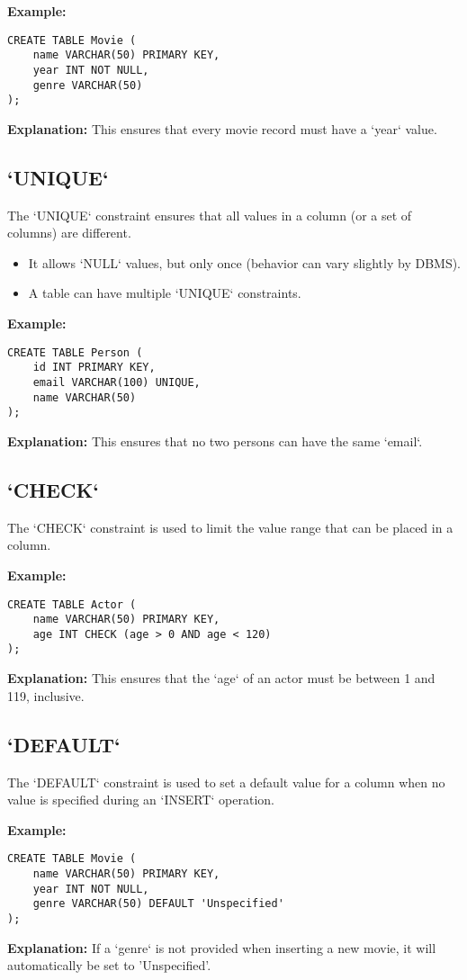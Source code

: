 \documentclass{article}
\begin{document}
\textbf{Example:} 
\begin{lstlisting}
CREATE TABLE Movie (
    name VARCHAR(50) PRIMARY KEY,
    year INT NOT NULL,
    genre VARCHAR(50)
);
\end{lstlisting}
\textbf{Explanation:} This ensures that every movie record must have a `year` value.

\subsection*{`UNIQUE`}
The `UNIQUE` constraint ensures that all values in a column (or a set of columns) are different.
\begin{itemize}
    \item It allows `NULL` values, but only once (behavior can vary slightly by DBMS). 
    \item A table can have multiple `UNIQUE` constraints. 
\end{itemize}

\textbf{Example:} 
\begin{lstlisting}
CREATE TABLE Person (
    id INT PRIMARY KEY,
    email VARCHAR(100) UNIQUE,
    name VARCHAR(50)
);
\end{lstlisting}
\textbf{Explanation:} This ensures that no two persons can have the same `email`.

\subsection*{`CHECK`}
The `CHECK` constraint is used to limit the value range that can be placed in a column.

\textbf{Example:} 
\begin{lstlisting}
CREATE TABLE Actor (
    name VARCHAR(50) PRIMARY KEY,
    age INT CHECK (age > 0 AND age < 120)
);
\end{lstlisting}
\textbf{Explanation:} This ensures that the `age` of an actor must be between 1 and 119, inclusive.

\subsection*{`DEFAULT`}
The `DEFAULT` constraint is used to set a default value for a column when no value is specified during an `INSERT` operation.

\textbf{Example:} 
\begin{lstlisting}
CREATE TABLE Movie (
    name VARCHAR(50) PRIMARY KEY,
    year INT NOT NULL,
    genre VARCHAR(50) DEFAULT 'Unspecified'
);
\end{lstlisting}
\textbf{Explanation:} If a `genre` is not provided when inserting a new movie, it will automatically be set to 'Unspecified'.
\end{document}
